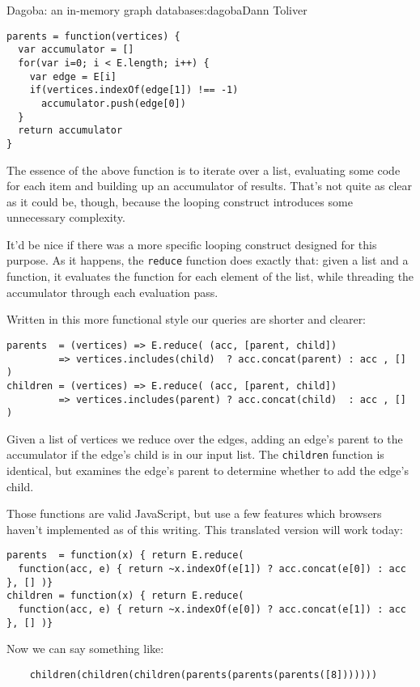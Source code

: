 \begin{aosachapter}{Dagoba: an in-memory graph database}{s:dagoba}{Dann Toliver}
\begin{verbatim}
parents = function(vertices) {
  var accumulator = []
  for(var i=0; i < E.length; i++) {
    var edge = E[i]
    if(vertices.indexOf(edge[1]) !== -1)
      accumulator.push(edge[0])
  }
  return accumulator
}
\end{verbatim}

The essence of the above function is to iterate over a list, evaluating
some code for each item and building up an accumulator of results.
That's not quite as clear as it could be, though, because the looping
construct introduces some unnecessary complexity.

It'd be nice if there was a more specific looping construct designed for
this purpose. As it happens, the \texttt{reduce} function does exactly
that: given a list and a function, it evaluates the function for each
element of the list, while threading the accumulator through each
evaluation pass.

Written in this more functional style our queries are shorter and
clearer:

\begin{verbatim}
parents  = (vertices) => E.reduce( (acc, [parent, child])
         => vertices.includes(child)  ? acc.concat(parent) : acc , [] )
children = (vertices) => E.reduce( (acc, [parent, child])
         => vertices.includes(parent) ? acc.concat(child)  : acc , [] )
\end{verbatim}

Given a list of vertices we reduce over the edges, adding an edge's
parent to the accumulator if the edge's child is in our input list. The
\texttt{children} function is identical, but examines the edge's parent
to determine whether to add the edge's child.

Those functions are valid JavaScript, but use a few features which
browsers haven't implemented as of this writing. This translated version
will work today:

\begin{verbatim}
parents  = function(x) { return E.reduce(
  function(acc, e) { return ~x.indexOf(e[1]) ? acc.concat(e[0]) : acc }, [] )}
children = function(x) { return E.reduce(
  function(acc, e) { return ~x.indexOf(e[0]) ? acc.concat(e[1]) : acc }, [] )}
\end{verbatim}

Now we can say something like:

\begin{verbatim}
    children(children(children(parents(parents(parents([8]))))))
\end{verbatim}


\end{aosachapter}
